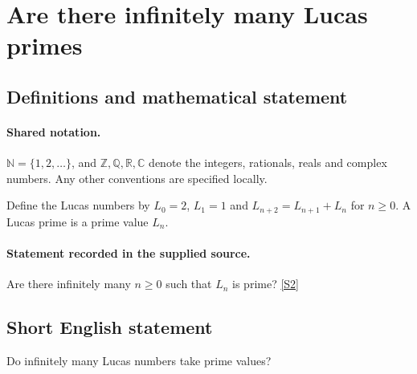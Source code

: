 \documentclass[11pt]{article}
\newcommand{\sref}[2]{\hyperlink{source:#1:#2}{[S#2]}}
\begin{document}
\section{Are there infinitely many Lucas primes}\label{statement}

\subsection{Definitions and mathematical statement}

\paragraph{Shared notation.}$\mathbb N=\{1,2,\ldots\}$, and $\mathbb Z,\mathbb Q,\mathbb R,\mathbb C$ denote the integers, rationals, reals and complex numbers. Any other conventions are specified locally.


Define the Lucas numbers by $L_0=2$, $L_1=1$ and $L_{n+2}=L_{n+1}+L_n$ for $n\ge0$. A Lucas prime is a prime value $L_n$.
\paragraph{Statement recorded in the supplied source.}
Are there infinitely many $n\ge0$ such that $L_n$ is prime? \sref{statement}{2}
\subsection{Short English statement}
Do infinitely many Lucas numbers take prime values?
\end{document}
